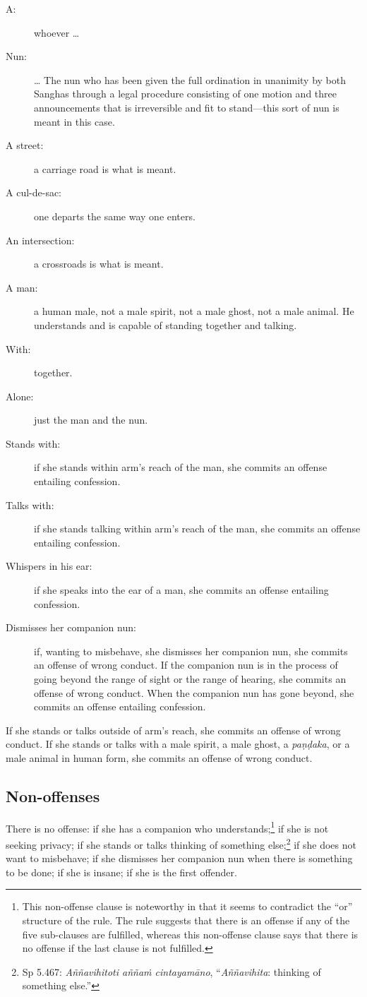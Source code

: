 \documentclass[12pt,openany]{book}%
\begin{document}
\begin{description}%
\item[A: ] whoever … %
\item[Nun: ] … The nun who has been given the full ordination in unanimity by both Sanghas through a legal procedure consisting of one motion and three announcements that is irreversible and fit to stand—this sort of nun is meant in this case. %
\item[A street: ] a carriage road is what is meant. %
\item[A cul-de-sac: ] one departs the same way one enters. %
\item[An intersection: ] a crossroads is what is meant. %
\item[A man: ] a human male, not a male spirit, not a male ghost, not a male animal. He understands and is capable of standing together and talking. %
\item[With: ] together. %
\item[Alone: ] just the man and the nun. %
\item[Stands with: ] if she stands within arm’s reach of the man, she commits an offense entailing confession. %
\item[Talks with: ] if she stands talking within arm’s reach of the man, she commits an offense entailing confession. %
\item[Whispers in his ear: ] if she speaks into the ear of a man, she commits an offense entailing confession. %
\item[Dismisses her companion nun: ] if, wanting to misbehave, she dismisses her companion nun, she commits an offense of wrong conduct. If the companion nun is in the process of going beyond the range of sight or the range of hearing, she commits an offense of wrong conduct. When the companion nun has gone beyond, she commits an offense entailing confession. %
\end{description}

If she stands or talks outside of arm’s reach, she commits an offense of wrong conduct. If she stands or talks with a male spirit, a male ghost, a \textit{\textsanskrit{paṇḍaka}}, or a male animal in human form, she commits an offense of wrong conduct. 

\subsection*{Non-offenses }

There is no offense: if she has a companion who understands;\footnote{This non-offense clause is noteworthy in that it seems to contradict the “or” structure of the rule. The rule suggests that there is an offense if any of the five sub-clauses are fulfilled, whereas this non-offense clause says that there is no offense if the last clause is not fulfilled. }  if she is not seeking privacy;  if she stands or talks thinking of something else;\footnote{Sp 5.467: \textit{\textsanskrit{Aññavihitoti} \textsanskrit{aññaṁ} \textsanskrit{cintayamāno}}, “\textit{\textsanskrit{Aññavihita}}: thinking of something else.” }  if she does not want to misbehave;  if she dismisses her companion nun when there is something to be done;  if she is insane;  if she is the first offender. 
\end{document}
